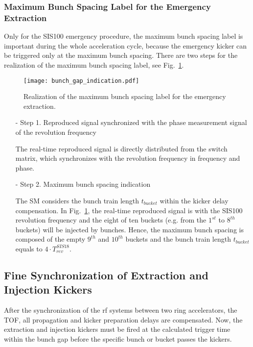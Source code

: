 \subsubsection{Maximum Bunch Spacing Label for the Emergency Extraction}

Only for the SIS100 emergency procedure, the maximum bunch spacing label is important during the whole acceleration cycle, because the emergency kicker can be triggered only at the maximum bunch spacing. There are two steps for the realization of the maximum bunch spacing label, see Fig.~\ref{Emergency_label}.
\begin{figure}[!htb]
   \centering   
   \texttt{[image: bunch\_gap\_indication.pdf]}
   \caption{Realization of the maximum bunch spacing label for the emergency extraction.}
   \label{Emergency_label}
\end{figure} 

\begin{itemize}
\item[-] Step 1. Reproduced signal synchronized with the phase measurement signal of the revolution frequency

The real-time reproduced signal is directly distributed from the switch matrix, which synchronizes with the revolution frequency in frequency and phase.
\item[-] Step 2. Maximum bunch spacing indication

The SM considers the bunch train length $t_{\mathit{bucket}}$ within the kicker delay compensation. In Fig.~\ref{Emergency_label}, the real-time reproduced signal is with the SIS100 revolution frequency and the eight of ten buckets (e.g. from the $1^{st}$ to $8^{th}$ buckets) will be injected by bunches. Hence, the maximum bunch spacing is composed of the empty $9^{th}$ and $10^{th}$ buckets and the bunch train length $t_{\mathit{bucket}}$ equals to $4\cdot T_{\mathit{rev}}^{\mathit{SIS18}}$.

\end{itemize}



\subsection{Fine Synchronization of Extraction and Injection Kickers}
After the synchronization of the rf systems between two ring accelerators, the TOF, all propagation and kicker preparation delays are compensated. Now, the extraction and injection kickers must be fired at the calculated trigger time within the bunch gap before the specific bunch or bucket passes the kickers.
 
